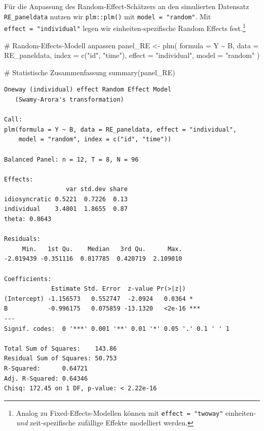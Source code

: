 \documentclass[
  a4paper,
  DIV=11,
  oneside]{scrreprt}
\newenvironment{Shaded}{\begin{snugshade}}{\end{snugshade}}
\newcommand{\AttributeTok}[1]{\textcolor[rgb]{0.40,0.45,0.13}{#1}}
\newcommand{\CommentTok}[1]{\textcolor[rgb]{0.37,0.37,0.37}{#1}}
\newcommand{\FunctionTok}[1]{\textcolor[rgb]{0.28,0.35,0.67}{#1}}
\newcommand{\NormalTok}[1]{\textcolor[rgb]{0.00,0.23,0.31}{#1}}
\newcommand{\OtherTok}[1]{\textcolor[rgb]{0.00,0.23,0.31}{#1}}
\newcommand{\SpecialCharTok}[1]{\textcolor[rgb]{0.37,0.37,0.37}{#1}}
\newcommand{\StringTok}[1]{\textcolor[rgb]{0.13,0.47,0.30}{#1}}
\begin{document}
Für die Anpassung des Random-Effect-Schätzers an den simulierten
Datensatz \texttt{RE\_paneldata} nutzen wir \texttt{plm::plm()} mit
\texttt{model\ =\ "random"}. Mit \texttt{effect\ =\ "individual"} legen
wir einheiten-spezifische Random Effects fest.\footnote{Analog zu
  Fixed-Effects-Modellen können mit \texttt{effect\ =\ "twoway"}
  einheiten- \emph{und} zeit-spezifische zufällige Effekte modelliert
  werden.}

\begin{Shaded}
\begin{Highlighting}[]
\CommentTok{\# Random{-}Effects{-}Modell anpassen}
\NormalTok{panel\_RE }\OtherTok{\textless{}{-}} \FunctionTok{plm}\NormalTok{(}
  \AttributeTok{formula =}\NormalTok{ Y }\SpecialCharTok{\textasciitilde{}}\NormalTok{ B, }
  \AttributeTok{data =}\NormalTok{ RE\_paneldata, }
  \AttributeTok{index =} \FunctionTok{c}\NormalTok{(}\StringTok{"id"}\NormalTok{, }\StringTok{"time"}\NormalTok{),}
  \AttributeTok{effect =} \StringTok{"individual"}\NormalTok{,}
  \AttributeTok{model =} \StringTok{"random"}
\NormalTok{)}

\CommentTok{\# Statistische Zusammenfassung}
\FunctionTok{summary}\NormalTok{(panel\_RE)}
\end{Highlighting}
\end{Shaded}

\begin{verbatim}
Oneway (individual) effect Random Effect Model 
   (Swamy-Arora's transformation)

Call:
plm(formula = Y ~ B, data = RE_paneldata, effect = "individual", 
    model = "random", index = c("id", "time"))

Balanced Panel: n = 12, T = 8, N = 96

Effects:
                 var std.dev share
idiosyncratic 0.5221  0.7226  0.13
individual    3.4801  1.8655  0.87
theta: 0.8643

Residuals:
     Min.   1st Qu.    Median   3rd Qu.      Max. 
-2.019439 -0.351116  0.017785  0.420719  2.109010 

Coefficients:
             Estimate Std. Error  z-value Pr(>|z|)    
(Intercept) -1.156573   0.552747  -2.0924   0.0364 *  
B           -0.996175   0.075859 -13.1320   <2e-16 ***
---
Signif. codes:  0 '***' 0.001 '**' 0.01 '*' 0.05 '.' 0.1 ' ' 1

Total Sum of Squares:    143.86
Residual Sum of Squares: 50.753
R-Squared:      0.64721
Adj. R-Squared: 0.64346
Chisq: 172.45 on 1 DF, p-value: < 2.22e-16
\end{verbatim}
\end{document}
